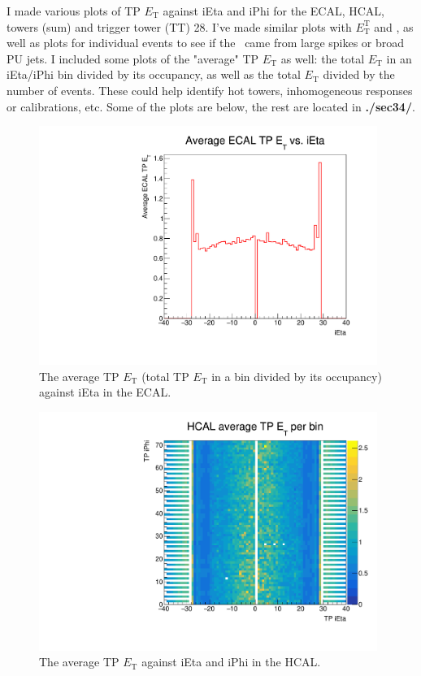 I made various plots of TP $E_{\mathrm{T}}$ against iEta and iPhi for the ECAL, HCAL, towers (sum) and trigger tower (TT) 28. I've made similar plots with $E_{\mathrm{T}}^{\mathrm{T}}$ and \etmiss, as well as plots for individual events to see if the \etmiss\ came from large spikes or broad PU jets. I included some plots of the "average" TP $E_{\mathrm{T}}$ as well: the total $E_{\mathrm{T}}$ in an iEta/iPhi bin divided by its occupancy, as well as the total $E_{\mathrm{T}}$ divided by the number of events. These could help identify hot towers, inhomogeneous responses or calibrations, etc. Some of the plots are below, the rest are located in \textbf{./sec34/}.

\begin{figure}[H]
\centering
\includegraphics[width=110mm]{./sec34/MET_studies_v6/Plots/ECAL/ECALTPETEta.pdf}
\caption{The average TP $E_{\mathrm{T}}$ (total TP $E_{\mathrm{T}}$ in a bin divided by its occupancy) against iEta in the ECAL.}
\end{figure}

\begin{figure}[H]
\centering
\includegraphics[width=110mm]{./sec34/MET_studies_v6/Plots/HCAL/HCALavgTPETEtaPhi.pdf}
\caption{The average TP $E_{\mathrm{T}}$ against iEta and iPhi in the HCAL.}
\end{figure}

